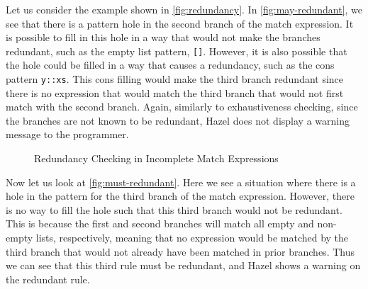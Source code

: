 Let us consider the example shown in \autoref{fig:redundancy}. 
In \autoref{fig:may-redundant}, we see that there is a pattern hole in the second branch of the match expression. 
It is possible to fill in this hole in a way that would not make the branches redundant, such as the empty list pattern, \texttt{[]}. 
However, it is also possible that the hole could be filled in a way that causes a redundancy, such as the cons pattern \texttt{y::xs}. 
This cons filling would make the third branch redundant since there is no expression that would match the third branch that would not first match with the second branch.
Again, similarly to exhaustiveness checking, since the branches are not known to be redundant, Hazel does not display a warning message to the programmer.

\begin{figure}[h]
  \centering
    \hfill
  \caption{Redundancy Checking in Incomplete Match Expressions}
  \label{fig:redundancy}
\end{figure}

Now let us look at \autoref{fig:must-redundant}. 
Here we see a situation where there is a hole in the pattern for the third branch of the match expression. 
However, there is no way to fill the hole such that this third branch would not be redundant. 
This is because the first and second branches will match all empty and non-empty lists, respectively, meaning that no expression would be matched by the third branch that would not already have been matched in prior branches.
Thus we can see that this third rule must be redundant, and Hazel shows a warning on the redundant rule.

